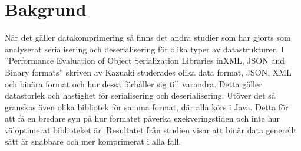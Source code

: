 \section{Bakgrund}
\label{sec:tim-background}
När det gäller datakomprimering så finns det andra studier som har gjorts som analyserat serialisering och deserialisering för olika typer av datastrukturer. I ''Performance Evaluation of Object Serialization Libraries inXML, JSON and Binary formats'' skriven av Kazuaki studerades olika data format, JSON, XML och binära format och hur dessa förhåller sig till varandra. Detta gäller datastorlek och hastighet för serialisering och deserialisering. Utöver det så granskas även olika bibliotek för samma format, där alla körs i Java. Detta för att få en bredare syn på hur formatet påverka exekveringstiden och inte hur väloptimerat biblioteket är. Resultatet från studien visar att binär data generellt sätt är snabbare och mer komprimerat i alla fall.
